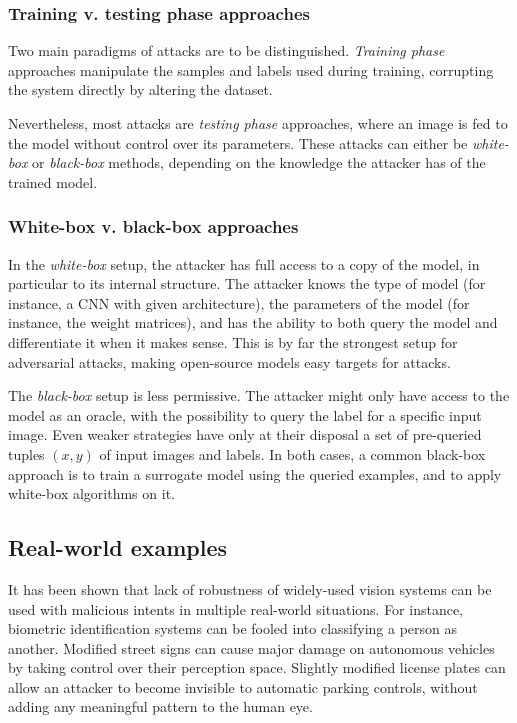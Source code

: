 \documentclass[twocolumn]{../../cs-classes/cs-classes}
\begin{document}
\subsubsection{Training v. testing phase approaches}
Two main paradigms of attacks are to be distinguished. \emph{Training phase} approaches manipulate the samples and labels used during training, corrupting the system directly by altering the dataset.

Nevertheless, most attacks are \emph{testing phase} approaches, where an image is fed to the model without control over its parameters. These attacks can either be \emph{white-box} or \emph{black-box} methods, depending on the knowledge the attacker has of the trained model.

\subsubsection{White-box v. black-box approaches}
In the \emph{white-box} setup, the attacker has full access to a copy of the model, in particular to its internal structure. The attacker knows the type of model (for instance, a CNN with given architecture), the parameters of the model (for instance, the weight matrices), and has the ability to both query the model and differentiate it when it makes sense. This is by far the strongest setup for adversarial attacks, making open-source models easy targets for attacks.

The \emph{black-box} setup is less permissive. The attacker might only have access to the model as an oracle, with the possibility to query the label for a specific input image. Even weaker strategies have only at their disposal a set of pre-queried tuples $(x, y)$ of input images and labels. In both cases, a common black-box approach is to train a surrogate model using the queried examples, and to apply white-box algorithms on it.

\subsection{Real-world examples}
It has been shown that lack of robustness of widely-used vision systems can be used with malicious intents in multiple real-world situations. For instance, biometric identification systems can be fooled into classifying a person as another. Modified street signs can cause major damage on autonomous vehicles by taking control over their perception space. Slightly modified license plates can allow an attacker to become invisible to automatic parking controls, without adding any meaningful pattern to the human eye.
\end{document}
